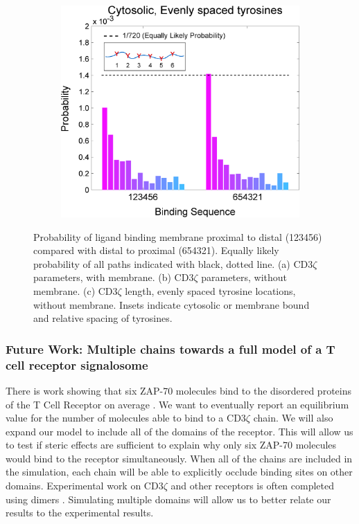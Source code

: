 \documentclass[../../AdvancementSummary.tex]{subfiles}
\begin{document}
\begin{figure}
\begin{center}
\begin{subfigure}{0.3\linewidth}
			\caption{}
		\end{subfigure}
		\begin{subfigure}{0.3\linewidth}
			\includegraphics[width=\linewidth]{ResultsFigures/MultipleSequentialBinding/EvenSites/ProbVSSequence.eps}
			\caption{}
		\end{subfigure}
	\end{center}
	\caption{Probability of ligand binding membrane proximal to distal (123456) compared with distal to proximal (654321). Equally likely probability of all paths indicated with black, dotted line. (a) CD3$\zeta$ parameters, with membrane. (b) CD3$\zeta$ parameters, without membrane. (c) CD3$\zeta$ length, evenly spaced tyrosine locations, without membrane. Insets indicate cytosolic or membrane bound and relative spacing of tyrosines. \label{fig: SimBindSeqBind}}
\end{figure}

\subsubsection{Future Work: Multiple chains towards a full model of a T cell receptor signalosome}

There is work showing that six ZAP-70 molecules bind to the disordered proteins of the T Cell Receptor on average \cite{ODonoghue2013}. We want to eventually report an equilibrium value for the number of molecules able to bind to a CD3$\zeta$ chain. We will also expand our model to include all of the domains of the receptor. This will allow us to test if steric effects are sufficient to explain why only six ZAP-70 molecules would bind to the receptor simultaneously. When all of the chains are included in the simulation, each chain will be able to explicitly occlude binding sites on other domains. Experimental work on CD3$\zeta$ and other receptors is often completed using dimers \cite{Mukhopadhyay2016, Dobbins2016}. Simulating multiple domains will allow us to better relate our results to the experimental results. 
\end{document}
